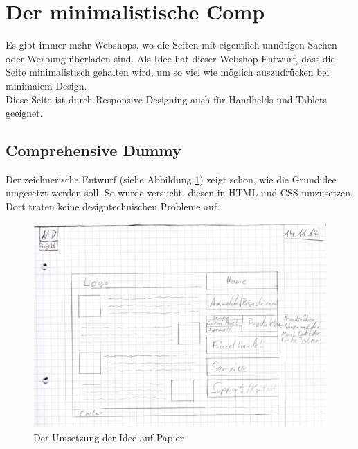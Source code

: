 \section{Der minimalistische Comp}
Es gibt immer mehr Webshops, wo die Seiten mit eigentlich unnötigen Sachen oder Werbung überladen sind. Als Idee hat dieser Webshop-Entwurf, dass die Seite minimalistisch gehalten wird, um so viel wie möglich auszudrücken bei minimalem Design.  
\\
Diese Seite ist durch Responsive Designing auch für Handhelds und Tablets geeignet.
	\subsection{Comprehensive Dummy}
Der zeichnerische Entwurf (siehe Abbildung \ref{mini_comp1}) zeigt schon, wie die Grundidee umgesetzt werden soll. So wurde versucht, diesen in HTML und CSS umzusetzen. Dort traten keine designtechnischen Probleme auf.
\begin{figure} [hp]
\includegraphics[width=\textwidth]{./img/mini_comp1.png}
\caption{Der Umsetzung der Idee auf Papier}
\label{mini_comp1}
\end{figure}
